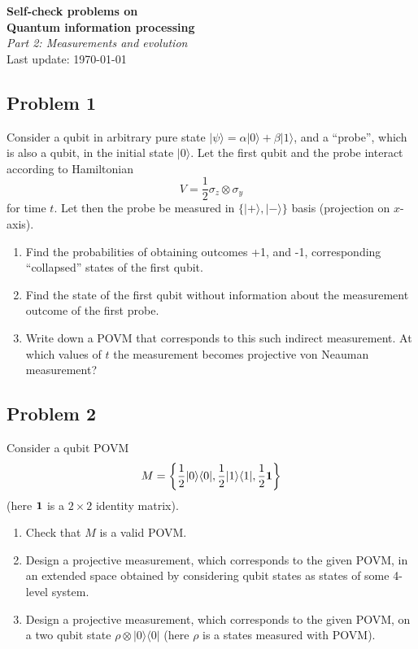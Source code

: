 \documentclass[a4paper,10pt]{article}
\newcommand{\ket}[1]{|#1\rangle}
\newcommand{\bra}[1]{\langle#1|}
\begin{document}
\begin{center}
\Large{{\bf Self-check problems on\\  Quantum information processing}\\{\it Part 2: Measurements and evolution}}\\
\vspace{5pt}
\large{Last update: \today}
\end{center}

\subsection*{Problem 1}
Consider a qubit in arbitrary pure state $\ket{\psi}=\alpha\ket{0}+\beta\ket{1}$, and a ``probe'', which is also a qubit, in the initial state $\ket{0}$.
Let the first qubit and the probe interact according to Hamiltonian 
\begin{equation}
	V=\frac{1}{2}\sigma_{z}\otimes\sigma_{y}
\end{equation} 
for time $t$.
Let then the probe be measured in $\{\ket{+}, \ket{-}\}$ basis (projection on $x$-axis).
\begin{enumerate}
	\item Find the probabilities of obtaining outcomes +1, and -1, corresponding ``collapsed'' states of the first qubit.
	\item Find the state of the first qubit without information about the measurement outcome of the first probe.
	\item Write down a POVM that corresponds to this such indirect measurement. At which values of $t$ the measurement becomes projective von Neauman measurement?
\end{enumerate}


\subsection*{Problem 2}
Consider a qubit POVM
\begin{equation}
	M = \left\{\frac{1}{2}\ket{0}\bra{0}, \frac{1}{2}\ket{1}\bra{1}, \frac{1}{2}{\bf 1}\right\}
\end{equation}
(here ${\bf 1}$ is a $2\times 2$ identity matrix).
\begin{enumerate}
	\item Check that $M$ is a valid POVM.
	\item Design a projective measurement, which corresponds to the given POVM, in an extended space obtained by considering qubit states as states of some 4-level system. 
	\item Design a projective measurement, which corresponds to the given POVM, on a two qubit state $\rho\otimes\ket{0}\bra{0}$ (here $\rho$ is a states measured with POVM).
\end{enumerate}
\end{document}

